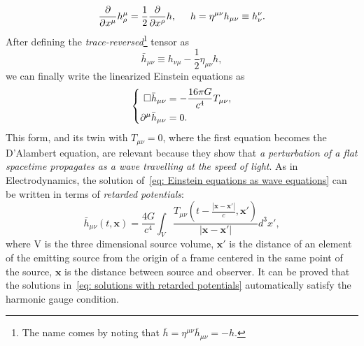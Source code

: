 \begin{equation}
    \frac{\partial}{\partial x^\mu}h^\mu_\rho = \frac{1}{2}\frac
    {\partial}{\partial x^\rho}h, \hspace{5mm} h=\eta^{\mu\nu}h_{\mu\nu}\equiv h^\nu_\nu.
\end{equation}
After defining the \textit{trace-reversed}\footnote{The name comes by noting that $\bar{h}=\eta^{\mu\nu}\bar{h}_{\mu\nu} = -h$.} tensor as
\begin{equation*}
    \bar{h}_{\mu\nu} \equiv h_{\nu\mu} - \frac{1}{2}\eta_{\mu\nu}h,
\end{equation*}
we can finally write the linearized Einstein equations as
\begin{equation}
    \left\{
        \begin{aligned}
            \square\bar{h}_{\mu\nu} &= -\frac{16\pi G}{c^4} T_{\mu\nu}, 
            \notag\\
                \partial^\mu \bar{h}_{\mu\nu} &= 0.
            \end{aligned}
    \right.
    \label{eq: Einstein equations as wave equations}
\end{equation}
This form, and its twin with $T_{\mu\nu}=0$, where the first equation becomes the D'Alambert equation, are relevant because they show that \textit{a perturbation of a flat spacetime propagates as a wave travelling at the speed of light}.
As in Electrodynamics, the solution of~\eqref{eq: Einstein equations as wave equations} can be written in terms of \textit{retarded potentials}:
\begin{equation}
    \bar{h}_{\mu\nu}(t,\mathbf{x}) = \frac{4G}{c^4}\int_V \frac{T_{\mu\nu}(t - \frac{|\mathbf{x} - \mathbf{x}'|}{c}, \mathbf{x}')}{|\mathbf{x} - \mathbf{x}'|}d^3x',
    \label{eq: solutions with retarded potentials}
\end{equation}
where V is the three dimensional source volume, $\mathbf{x}'$ is the distance of an element of the emitting source from the origin of a frame centered in the same point of the source, $\mathbf{x}$ is the distance between source and observer.
It can be proved that the solutions in~\eqref{eq: solutions with retarded potentials} automatically satisfy the harmonic gauge condition.

